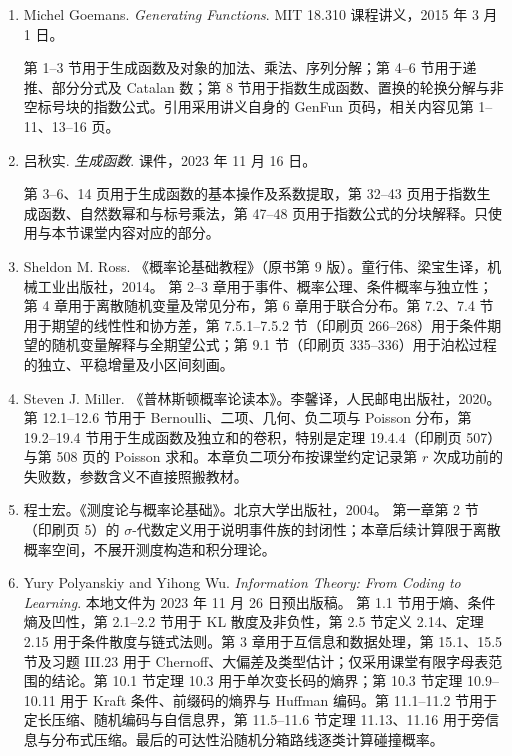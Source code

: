 \documentclass[lang=cn,a4paper,fontset=none,zihao=false,10pt,openany,twoside]{beautybook}
\numberwithin{algorithm}{chapter}
\begin{document}
\begin{enumerate}[(1)]
第 7.2--7.3 节（印刷页 215--227）用于普通与指数生成函数、按规模分配及按标号分配的乘法；第 5.5 节用于广义二项式展开。第 14.2--14.3 节（印刷页 552--572）用于 Burnside 公式、轮换计数、循环指标及 Pólya 的颜色库存代入。第 7.2 节第 218 页与第 7.3 节第 224 页的多重组合、排列模型用于 OGF/EGF 的对比题。

\item Michel Goemans. \emph{Generating Functions}. MIT 18.310 课程讲义，2015 年 3 月 1 日。

第 1--3 节用于生成函数及对象的加法、乘法、序列分解；第 4--6 节用于递推、部分分式及 Catalan 数；第 8 节用于指数生成函数、置换的轮换分解与非空标号块的指数公式。引用采用讲义自身的 GenFun 页码，相关内容见第 1--11、13--16 页。

\item 吕秋实. \emph{生成函数}. 课件，2023 年 11 月 16 日。

第 3--6、14 页用于生成函数的基本操作及系数提取，第 32--43 页用于指数生成函数、自然数幂和与标号乘法，第 47--48 页用于指数公式的分块解释。只使用与本节课堂内容对应的部分。
\item Sheldon M. Ross. 《概率论基础教程》（原书第 9 版）。童行伟、梁宝生译，机械工业出版社，2014。
第 2--3 章用于事件、概率公理、条件概率与独立性；第 4 章用于离散随机变量及常见分布，第 6 章用于联合分布。第 7.2、7.4 节用于期望的线性性和协方差，第 7.5.1--7.5.2 节（印刷页 266--268）用于条件期望的随机变量解释与全期望公式；第 9.1 节（印刷页 335--336）用于泊松过程的独立、平稳增量及小区间刻画。

\item Steven J. Miller. 《普林斯顿概率论读本》。李馨译，人民邮电出版社，2020。
第 12.1--12.6 节用于 Bernoulli、二项、几何、负二项与 Poisson 分布，第 19.2--19.4 节用于生成函数及独立和的卷积，特别是定理 19.4.4（印刷页 507）与第 508 页的 Poisson 求和。本章负二项分布按课堂约定记录第 $r$ 次成功前的失败数，参数含义不直接照搬教材。

\item 程士宏。《测度论与概率论基础》。北京大学出版社，2004。
第一章第 2 节（印刷页 5）的 $\sigma$-代数定义用于说明事件族的封闭性；本章后续计算限于离散概率空间，不展开测度构造和积分理论。
\item Yury Polyanskiy and Yihong Wu. \emph{Information Theory: From Coding to Learning}. 本地文件为 2023 年 11 月 26 日预出版稿。
第 1.1 节用于熵、条件熵及凹性，第 2.1--2.2 节用于 KL 散度及非负性，第 2.5 节定义 2.14、定理 2.15 用于条件散度与链式法则。第 3 章用于互信息和数据处理，第 15.1、15.5 节及习题 III.23 用于 Chernoff、大偏差及类型估计；仅采用课堂有限字母表范围的结论。第 10.1 节定理 10.3 用于单次变长码的熵界；第 10.3 节定理 10.9--10.11 用于 Kraft 条件、前缀码的熵界与 Huffman 编码。第 11.1--11.2 节用于定长压缩、随机编码与自信息界，第 11.5--11.6 节定理 11.13、11.16 用于旁信息与分布式压缩。最后的可达性沿随机分箱路线逐类计算碰撞概率。
\end{enumerate}
\end{document}
